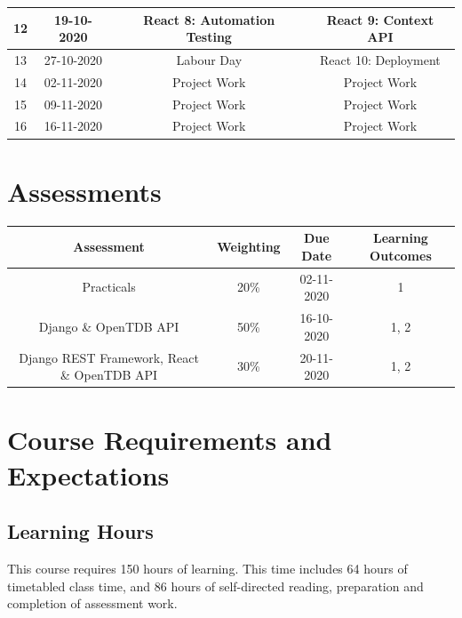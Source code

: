 \documentclass{article}
\begin{document}
\begin{tabular}{|c|c|c|c|}
	\small 12     & \small 19-10-2020 & \small React 8:  Automation Testing                                 & \small React 9: Context API                        \\ \hline
	\small 13     & \small 27-10-2020 & \cellcolor{yellow} \small Labour Day                   & \small React 10: Deployment                                          \\ \hline
	\small 14     & \small 02-11-2020 & \small Project Work                                    & \small Project Work                                         \\ \hline
	\small 15     & \small 09-11-2020 & \small Project Work                                    & \small Project Work                                         \\ \hline
	\small 16     & \small 16-11-2020 & \small Project Work                                    & \small Project Work                                         \\ \hline
\end{tabular}

\section*{Assessments}
\renewcommand{\arraystretch}{1.5}
\begin{tabular}{|c|c|c|c|}
	\hline
	\textbf{Assessment}                                & \textbf{Weighting} & \textbf{Due Date} & \textbf{Learning Outcomes} \\ \hline 
	\small Practicals                                  & \small 20\%        & \small 02-11-2020 & \small 1                   \\ \hline
	\small Django \& OpenTDB API                       & \small 50\%        & \small 16-10-2020 & \small 1, 2                \\ \hline
	\small Django REST Framework, React \& OpenTDB API & \small 30\%        & \small 20-11-2020 & \small 1, 2                \\ \hline
\end{tabular}

\section*{Course Requirements and Expectations}

\subsection*{Learning Hours}
This course requires 150 hours of learning. This time includes 64 hours of timetabled class time, and 86 hours of self-directed reading, preparation and completion of assessment work.
\end{document}

